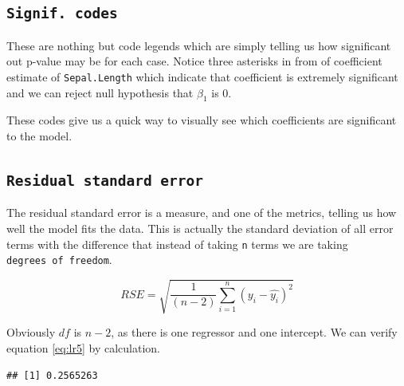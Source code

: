 \documentclass[
]{book}
\newenvironment{Shaded}{\begin{snugshade}}{\end{snugshade}}
\newcommand{\DecValTok}[1]{\textcolor[rgb]{0.00,0.00,0.81}{#1}}
\newcommand{\FunctionTok}[1]{\textcolor[rgb]{0.13,0.29,0.53}{\textbf{#1}}}
\newcommand{\NormalTok}[1]{#1}
\newcommand{\SpecialCharTok}[1]{\textcolor[rgb]{0.81,0.36,0.00}{\textbf{#1}}}
\newcommand{\StringTok}[1]{\textcolor[rgb]{0.31,0.60,0.02}{#1}}
\begin{document}
\hypertarget{signif.-codes}{%
\subsection{\texorpdfstring{\texttt{Signif.\ codes}}{Signif. codes}}\label{signif.-codes}}

These are nothing but code legends which are simply telling us how significant out p-value may be for each case. Notice three asterisks in from of coefficient estimate of \texttt{Sepal.Length} which indicate that coefficient is extremely significant and we can reject null hypothesis that \(\beta_1\) is \(0\).

These codes give us a quick way to visually see which coefficients are significant to the model.

\hypertarget{residual-standard-error}{%
\subsection{\texorpdfstring{\texttt{Residual\ standard\ error}}{Residual standard error}}\label{residual-standard-error}}

The residual standard error is a measure, and one of the metrics, telling us how well the model fits the data. This is actually the standard deviation of all error terms with the difference that instead of taking \texttt{n} terms we are taking \texttt{degrees\ of\ freedom}.

\begin{equation} 
RSE = \sqrt{\frac{1}{(n-2)} \sum_{i=1}^n (y_i - \hat{y_i})^2}
\label{eq:lr5}
\end{equation}

Obviously \(df\) is \(n-2\), as there is one regressor and one intercept. We can verify equation \eqref{eq:lr5} by calculation.

\begin{Shaded}
\end{Shaded}

\begin{verbatim}
## [1] 0.2565263
\end{verbatim}
\end{document}
